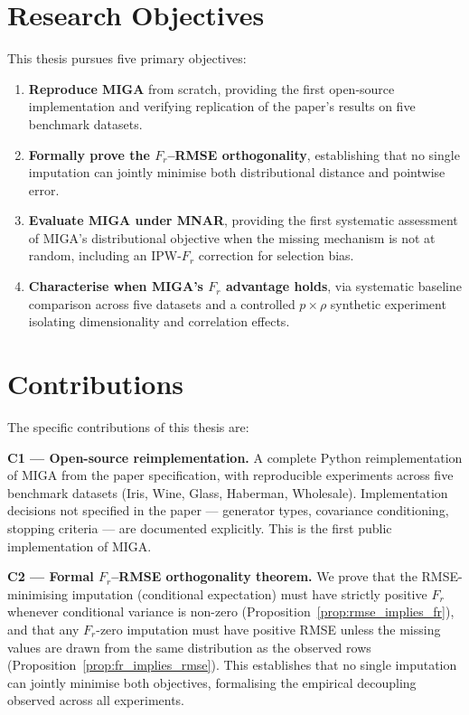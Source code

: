
\section{Research Objectives}

This thesis pursues five primary objectives:

\begin{enumerate}
    \item \textbf{Reproduce MIGA} from scratch, providing the first open-source implementation and verifying replication of the paper's results on five benchmark datasets.
    \item \textbf{Formally prove the $F_r$--RMSE orthogonality}, establishing that no single imputation can jointly minimise both distributional distance and pointwise error.
    \item \textbf{Evaluate MIGA under MNAR}, providing the first systematic assessment of MIGA's distributional objective when the missing mechanism is not at random, including an IPW-$F_r$ correction for selection bias.
    \item \textbf{Characterise when MIGA's $F_r$ advantage holds}, via systematic baseline comparison across five datasets and a controlled $p \times \rho$ synthetic experiment isolating dimensionality and correlation effects.
\end{enumerate}


\section{Contributions}

The specific contributions of this thesis are:

\textbf{C1 --- Open-source reimplementation.} A complete Python reimplementation of MIGA from the paper specification, with reproducible experiments across five benchmark datasets (Iris, Wine, Glass, Haberman, Wholesale). Implementation decisions not specified in the paper --- generator types, covariance conditioning, stopping criteria --- are documented explicitly. This is the first public implementation of MIGA.

\textbf{C2 --- Formal $F_r$--RMSE orthogonality theorem.} We prove that the RMSE-minimising imputation (conditional expectation) must have strictly positive $F_r$ whenever conditional variance is non-zero (Proposition~\ref{prop:rmse_implies_fr}), and that any $F_r$-zero imputation must have positive RMSE unless the missing values are drawn from the same distribution as the observed rows (Proposition~\ref{prop:fr_implies_rmse}). This establishes that no single imputation can jointly minimise both objectives, formalising the empirical decoupling observed across all experiments.

